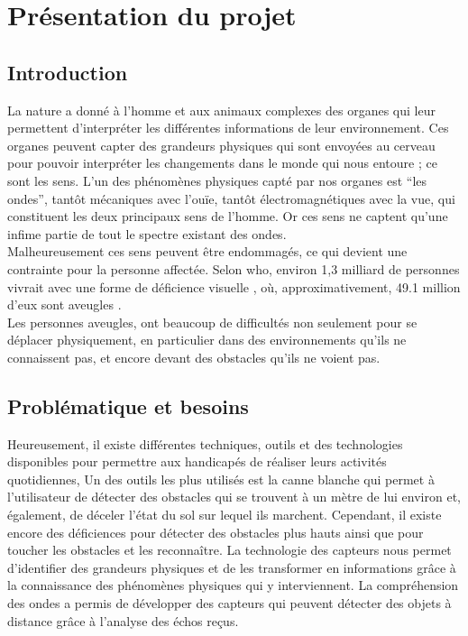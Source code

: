\chapter{Présentation du projet}

\section{Introduction}

La nature a donné à l’homme et aux animaux complexes des organes qui leur permettent d’interpréter les différentes informations de leur environnement. Ces organes peuvent capter des grandeurs physiques qui sont envoyées au cerveau pour pouvoir interpréter les changements dans le monde qui nous entoure ; ce sont les sens. L’un des phénomènes physiques capté par nos organes est “les ondes”, tantôt mécaniques avec l’ouïe, tantôt électromagnétiques avec la vue, qui constituent les deux principaux sens de l’homme. Or ces sens ne captent qu’une infime partie de tout le spectre existant des ondes. \\
Malheureusement ces sens peuvent être endommagés, ce qui devient une contrainte pour la personne affectée. Selon \acrfull{who}, environ 1,3 milliard de personnes vivrait avec une forme de déficience visuelle \cite{WHO-blindness-and-visual-impairment}, où, approximativement, 49.1 million d'eux sont aveugles \cite{number-of-blind}. \\
Les personnes aveugles, ont beaucoup de difficultés non seulement pour se déplacer physiquement, en particulier dans des environnements qu'ils ne connaissent pas, et encore devant des obstacles qu’ils ne voient pas.


\section{Problématique et besoins}

Heureusement, il existe différentes techniques, outils et des technologies disponibles pour permettre aux handicapés de réaliser leurs activités quotidiennes, Un des outils les plus utilisés est la canne blanche qui permet à l’utilisateur de détecter des obstacles qui se trouvent à un mètre de lui environ et, également, de déceler l’état du sol sur lequel ils marchent. Cependant, il existe encore des déficiences pour détecter des obstacles plus hauts ainsi que pour toucher les obstacles et les reconnaître. La technologie des capteurs nous permet d’identifier des grandeurs physiques et de les transformer en informations grâce à la connaissance des phénomènes physiques qui y interviennent. La compréhension des ondes a permis de développer des capteurs qui peuvent détecter des objets à distance grâce à l’analyse des échos reçus.

